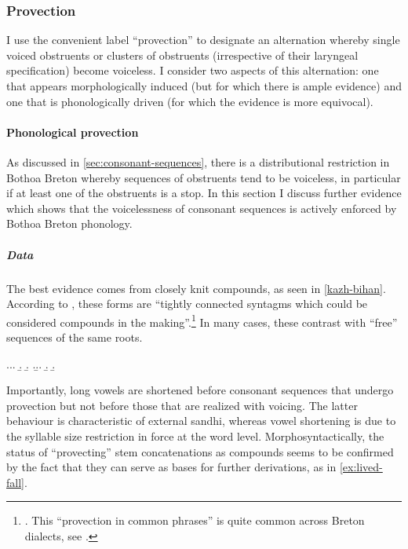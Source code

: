 \subsubsection{Provection}
\label{sec:provection}

I use the convenient label \enquote{provection} \citep[\cfm][\S446--449 \emph{et passim}]{histbreton} to designate an alternation whereby single voiced obstruents or clusters of obstruents (irrespective of their laryngeal specification) become voiceless. I consider two aspects of this alternation: one that appears morphologically induced (but for which there is ample evidence) and one that is phonologically driven (for which the evidence is more equivocal).

\paragraph{Phonological provection}
\label{sec:phon-driv-prov}

As discussed in \cref{sec:consonant-sequences}, there is a distributional restriction in Bothoa Breton whereby sequences of obstruents tend to be voiceless, in particular if at least one of the obstruents is a stop. In this section I discuss further evidence which shows that the voicelessness of consonant sequences is actively enforced by Bothoa Breton phonology.

\subparagraph{Data}
\label{sec:data-2}

The best evidence comes from closely knit compounds, as seen in \cref{kazh-bihan}. According to \citet[p.~202]{humphreys95:_phonol_bothoa_saint_nicol_pelem}, these forms are \enquote{tightly connected syntagms which could be considered compounds in the making}.\footnote{. This \enquote{provection in common phrases} is quite common across Breton dialects, see \citet[§§487--489]{histbreton}.} In many cases, these contrast with \enquote{free} sequences of the same roots.

\ex.\label{kazh-bihan}\a.\a.
\b.
\b.
\z.\b.\a.
\b.
\b.

Importantly, long vowels are shortened before consonant sequences that undergo provection but not before those that are realized with voicing. The latter behaviour is characteristic of external sandhi, whereas vowel shortening is due to the syllable size restriction in force at the word level. Morphosyntactically, the status of \enquote{provecting} stem concatenations as compounds seems to be confirmed by the fact that they can serve as bases for further derivations, as in \cref{ex:lived-fall}.

